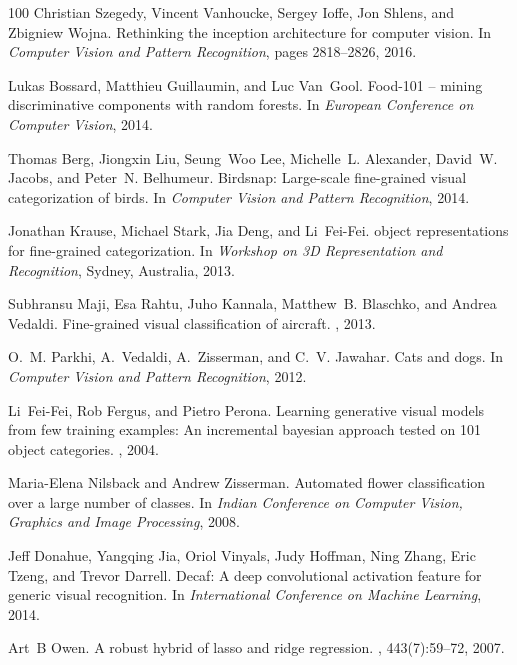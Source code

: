 \documentclass{article}
\begin{document}
{\begin{thebibliography}{100}
Christian Szegedy, Vincent Vanhoucke, Sergey Ioffe, Jon Shlens, and Zbigniew
  Wojna.
\newblock Rethinking the inception architecture for computer vision.
\newblock In {\em Computer Vision and Pattern Recognition}, pages 2818--2826,
  2016.

Lukas Bossard, Matthieu Guillaumin, and Luc Van~Gool.
\newblock Food-101 -- mining discriminative components with random forests.
\newblock In {\em European Conference on Computer Vision}, 2014.

Thomas Berg, Jiongxin Liu, Seung~Woo Lee, Michelle~L. Alexander, David~W.
  Jacobs, and Peter~N. Belhumeur.
\newblock Birdsnap: Large-scale fine-grained visual categorization of birds.
\newblock In {\em Computer Vision and Pattern Recognition}, 2014.

Jonathan Krause, Michael Stark, Jia Deng, and Li~Fei-Fei.
 object representations for fine-grained categorization.
\newblock In {\em Workshop on 3D Representation and Recognition}, Sydney,
  Australia, 2013.

Subhransu Maji, Esa Rahtu, Juho Kannala, Matthew~B. Blaschko, and Andrea
  Vedaldi.
\newblock Fine-grained visual classification of aircraft.
, 2013.

O.~M. Parkhi, A.~Vedaldi, A.~Zisserman, and C.~V. Jawahar.
\newblock Cats and dogs.
\newblock In {\em Computer Vision and Pattern Recognition}, 2012.

Li~Fei-Fei, Rob Fergus, and Pietro Perona.
\newblock Learning generative visual models from few training examples: An
  incremental bayesian approach tested on 101 object categories.
, 2004.

Maria-Elena Nilsback and Andrew Zisserman.
\newblock Automated flower classification over a large number of classes.
\newblock In {\em Indian Conference on Computer Vision, Graphics and Image
  Processing}, 2008.

Jeff Donahue, Yangqing Jia, Oriol Vinyals, Judy Hoffman, Ning Zhang, Eric
  Tzeng, and Trevor Darrell.
\newblock Decaf: A deep convolutional activation feature for generic visual
  recognition.
\newblock In {\em International Conference on Machine Learning}, 2014.

Art~B Owen.
\newblock A robust hybrid of lasso and ridge regression.
, 443(7):59--72, 2007.


\end{thebibliography}}
\end{document}

